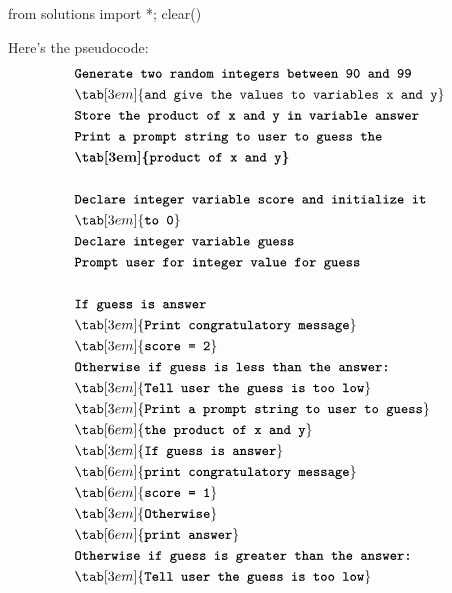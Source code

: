 \begin{python0}
from solutions import *; clear()
\end{python0}

Here's the pseudocode:
\begin{align*}
& \textbf{\texttt{Generate two random integers between 90 and 99}}\\
& \tab[3em]{\texttt{and give the values to variables x and y}}\\
& \textbf{\texttt{Store the product of x and y in variable answer}}\\
& \textbf{\texttt{Print a prompt string to user to guess the}}\\
& \textbf{\tab[3em]{\texttt{product of x and y}}}\\\\
& \texttt{\textbf{Declare integer variable score and initialize it}}\\
& \tab[3em]{\textbf{\texttt{to 0}}}\\
& \textbf{\texttt{Declare integer variable guess}}\\
& \texttt{\textbf{Prompt user for integer value for guess}}\\\\
& \texttt{\textbf{If guess is answer}}\\
& \tab[3em]{\texttt{\textbf{Print congratulatory message}}}\\
& \tab[3em]{\texttt{\textbf{score = 2}}}\\
& \texttt{\textbf{Otherwise if guess is less than the answer:}}\\
& \tab[3em]{\texttt{\textbf{Tell user the guess is too low}}}\\
& \tab[3em]{\texttt{\textbf{Print a prompt string to user to guess}}}\\
& \tab[6em]{\texttt{\textbf{the product of x and y}}}\\
& \tab[3em]{\texttt{\textbf{If guess is answer}}}\\
& \tab[6em]{\texttt{\textbf{print congratulatory message}}}\\
& \tab[6em]{\texttt{\textbf{score = 1}}}\\
& \tab[3em]{\texttt{\textbf{Otherwise}}}\\
& \tab[6em]{\texttt{\textbf{print answer}}}\\
& \texttt{\textbf{Otherwise if guess is greater than the answer:}}\\
& \tab[3em]{\texttt{\textbf{Tell user the guess is too low}}}\\

\end{align*}
